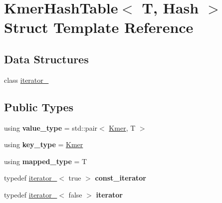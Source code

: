 \hypertarget{structKmerHashTable}{}\section{Kmer\+Hash\+Table$<$ T, Hash $>$ Struct Template Reference}
\label{structKmerHashTable}
\subsection*{Data Structures}
\begin{DoxyCompactItemize}
\item 
class \hyperlink{classKmerHashTable_1_1iterator__}{iterator\+\_\+}
\end{DoxyCompactItemize}
\subsection*{Public Types}
\begin{DoxyCompactItemize}
\item 
\mbox{\label{structKmerHashTable_afcdc385bdc2a4a932d5ca9c8a1c079cb}} 
using {\bfseries value\+\_\+type} = std\+::pair$<$ \hyperlink{classKmer}{Kmer}, T $>$
\item 
\mbox{\label{structKmerHashTable_acb899215151d95d39ef506ffb3da8e83}} 
using {\bfseries key\+\_\+type} = \hyperlink{classKmer}{Kmer}
\item 
\mbox{\label{structKmerHashTable_a8d1346b148f17eccab8cfdf9b7f41a51}} 
using {\bfseries mapped\+\_\+type} = T
\item 
\mbox{\label{structKmerHashTable_a4e5fd8b93ae47cc21e6118c93b7838a1}} 
typedef \hyperlink{classKmerHashTable_1_1iterator__}{iterator\+\_\+}$<$ true $>$ {\bfseries const\+\_\+iterator}
\item 
\mbox{\label{structKmerHashTable_a9132a1d218dc9f406c257f0da223ba35}} 
typedef \hyperlink{classKmerHashTable_1_1iterator__}{iterator\+\_\+}$<$ false $>$ {\bfseries iterator}
\end{DoxyCompactItemize}
